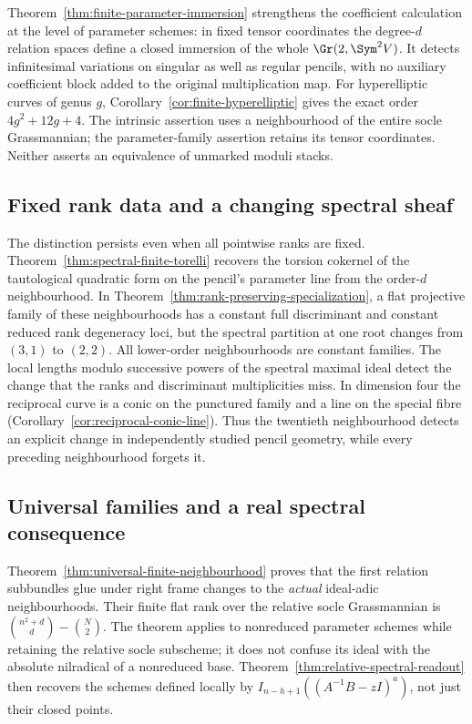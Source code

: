 Theorem~\ref{thm:finite-parameter-immersion} strengthens the
coefficient calculation at the level of parameter schemes: in fixed
tensor coordinates the degree-\(d\) relation spaces define a
closed immersion of the whole \(\Gr(2,\Sym^2V)\).
It detects infinitesimal variations on singular as well as regular
pencils, with no auxiliary coefficient block added to the original
multiplication map.  For hyperelliptic curves of genus \(g\),
Corollary~\ref{cor:finite-hyperelliptic} gives the exact order
\(4g^2+12g+4\).  The intrinsic assertion uses a neighbourhood
of the entire socle Grassmannian; the parameter-family assertion
retains its tensor coordinates.  Neither asserts an equivalence
of unmarked moduli stacks.

\subsection{Fixed rank data and a changing spectral sheaf}

The distinction persists even when all pointwise ranks are fixed.
Theorem~\ref{thm:spectral-finite-torelli} recovers the torsion
cokernel of the tautological quadratic form on the pencil's parameter
line from the order-\(d\) neighbourhood.  In
Theorem~\ref{thm:rank-preserving-specialization}, a flat projective
family of these neighbourhoods has a constant full discriminant and
constant reduced rank degeneracy loci, but the spectral partition at
one root changes from \((3,1)\) to \((2,2)\).  All lower-order
neighbourhoods are constant families.  The local lengths modulo
successive powers of the spectral maximal ideal detect the change
that the ranks and discriminant multiplicities miss.  In dimension
four the reciprocal curve is a conic on the punctured family and a
line on the special fibre
(Corollary~\ref{cor:reciprocal-conic-line}).  Thus the twentieth
neighbourhood detects an explicit change in independently studied
pencil geometry, while every preceding neighbourhood forgets it.

\subsection{Universal families and a real spectral consequence}

Theorem~\ref{thm:universal-finite-neighbourhood} proves that the
first relation subbundles glue under right frame changes to the
\emph{actual} ideal-adic neighbourhoods.  Their finite flat rank over
the relative socle Grassmannian is
\(\binom{n^2+d}{d}-\binom{N}{2}\).  The theorem applies to
nonreduced parameter schemes while retaining the relative socle
subscheme; it does not confuse its ideal with the absolute nilradical
of a nonreduced base.  Theorem~\ref{thm:relative-spectral-readout}
then recovers the schemes defined locally by
\(I_{n-h+1}((A^{-1}B-zI)^a)\), not just their closed points.

